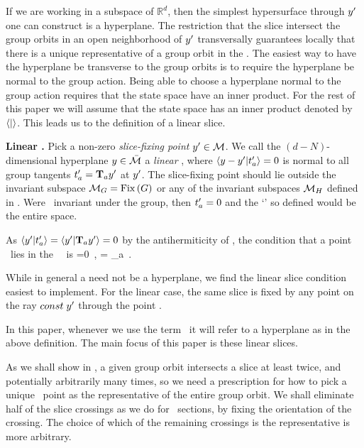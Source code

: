 {If we are working in a subspace of $\mathbb{R}^d$, then the simplest hypersurface through ${y'}$ one can construct is a hyperplane. The restriction that the slice intersect the group orbits in an open neighborhood of ${y'}$ transversally guarantees locally that there is a unique representative of a group orbit in the \slice. The easiest way to have the hyperplane be transverse to the group orbits is to require the hyperplane be normal to the group action.
Being able to choose a hyperplane normal to the group action requires that the state space have an inner product. For the rest of this paper we will assume that the state space has an inner product denoted by $\left\langle {}|{} \right\rangle$.
This leads us to the definition of a linear slice.

\begin{definition}
\label{def:slice}
\textbf{Linear \slice.}
Pick a non-zero \emph{slice-fixing point} ${y'} \in {\cal M}$.
We call the $(d\!-\!N)$-dimensional hyperplane $y \in \bar{\cal M}$
a \emph{linear \slice}, where
\(
\left\langle {\ensuremath{y}- {\ensuremath{y'}}}|{t'_{a}} \right\rangle=0
\) %
is normal to all group tangents $ t'_{a}= \mathbf{T}_a {y'}$ at ${y'}$. The {slice-fixing point} should lie outside the invariant subspace ${\cal M}_{G} = \mathrm{Fix}\left(G\right)$ or any of the invariant subspaces ${\cal M}_H$ defined in . Were \slicep\ invariant under the group, then $t'_{a}=0$ and the `\slice' so defined would be the entire space.

As $ \left\langle {{\ensuremath{y'}}}|{t'_{a}} \right\rangle=\left\langle {{\ensuremath{y'}}}|{\mathbf{T}_a {y'}} \right\rangle =0 $ by the antihermiticity of \Lg, the condition that a point \sspRed\ lies in the \slice\ \pSRed\ is
\beq
{}=0
    \,,\qquad
{} = \Lg_a \slicep
\,.
\end{definition}


While in general a {\slice} need not be a hyperplane,
we find the linear slice condition  easiest to implement.
For the linear case, the same slice is fixed by any
point on the ray $const\; {y'}$ through the point \slicep.

In this paper, whenever we use the term \slice\ it will refer to a hyperplane as in the above definition. The main focus of this paper is these linear slices.

As we shall show in , a given group orbit intersects a slice at
least twice, and potentially arbitrarily many times, so we need a prescription for
how to pick a unique \reducedsp\ point as the representative of the entire group orbit.
We shall eliminate half of the slice crossings as we do for
\Poincare\ sections, by fixing the orientation of the crossing.
The choice of which of the remaining crossings is the representative
is more arbitrary.

}
